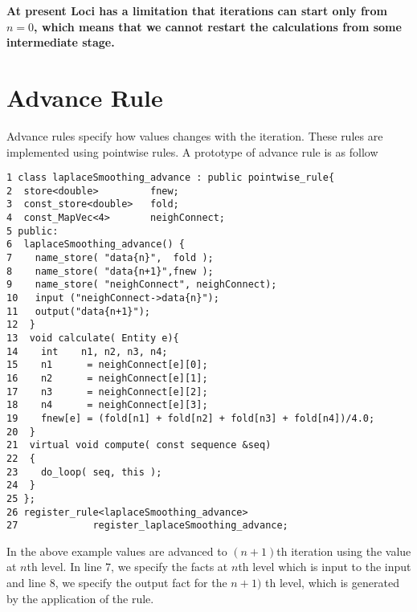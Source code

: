 \par {\bf At present Loci has a limitation that iterations can start only from $n=0$,
which means that we cannot restart the calculations from some intermediate stage.} 
%
\section {Advance Rule}
\par Advance rules specify how values changes with the iteration. These rules are 
implemented using pointwise rules. A prototype of advance rule is as follow
\begin{verbatim}
1 class laplaceSmoothing_advance : public pointwise_rule{
2  store<double>         fnew;
3  const_store<double>   fold;
4  const_MapVec<4>       neighConnect;
5 public:
6  laplaceSmoothing_advance() {
7    name_store( "data{n}",  fold );
8    name_store( "data{n+1}",fnew );
9    name_store( "neighConnect", neighConnect);
10   input ("neighConnect->data{n}");
11   output("data{n+1}");
12  }
13  void calculate( Entity e){
14    int    n1, n2, n3, n4;
15    n1      = neighConnect[e][0];
16    n2      = neighConnect[e][1];
17    n3      = neighConnect[e][2];
18    n4      = neighConnect[e][3];
19    fnew[e] = (fold[n1] + fold[n2] + fold[n3] + fold[n4])/4.0;
20  }
21  virtual void compute( const sequence &seq)
22  {
23    do_loop( seq, this );
24  }
25 };
26 register_rule<laplaceSmoothing_advance>
27             register_laplaceSmoothing_advance;
\end{verbatim}

In the above example values are advanced to $(n+1)$th iteration using the
value at $n$th level. In line 7, we specify the facts at $n$th level which
is input to the input and line 8, we specify the output fact for the $n+1)$
th level, which is generated by the application of the rule. 

